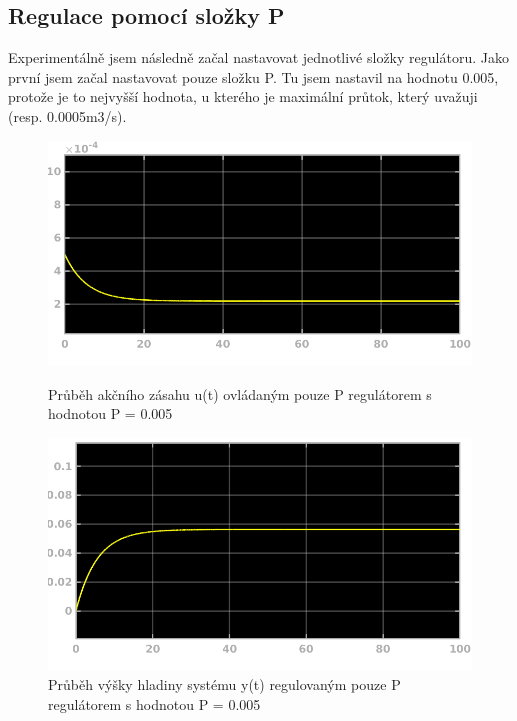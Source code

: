 \documentclass{article}
\begin{document}
\subsection{Regulace pomocí složky P}   	
   	
   	\indent Experimentálně jsem následně začal nastavovat jednotlivé složky regulátoru. Jako první jsem začal nastavovat pouze složku P. Tu jsem nastavil na hodnotu 0.005, protože je to nejvyšší hodnota, u kterého je maximální průtok, který uvažuji (resp. 0.0005m3/s).
   	
   	\begin{figure}[H]
	   		 \begin{minipage}[b]{.45\textwidth}
    \centering
    \includegraphics[width=\linewidth]{ukol3P0005u}
    \caption{Průběh akčního zásahu u(t) ovládaným pouze P regulátorem s hodnotou P = 0.005}
  \end{minipage}\hfill
  \begin{minipage}[b]{.45\textwidth}
    \centering
    \includegraphics[width=\linewidth]{ukol3P0005y}
    \caption{Průběh výšky hladiny systému y(t) regulovaným pouze P regulátorem s hodnotou P = 0.005}
    \label{img:hladinaP0005}
  \end{minipage}
	   		\end{figure}
   	
\end{document}
